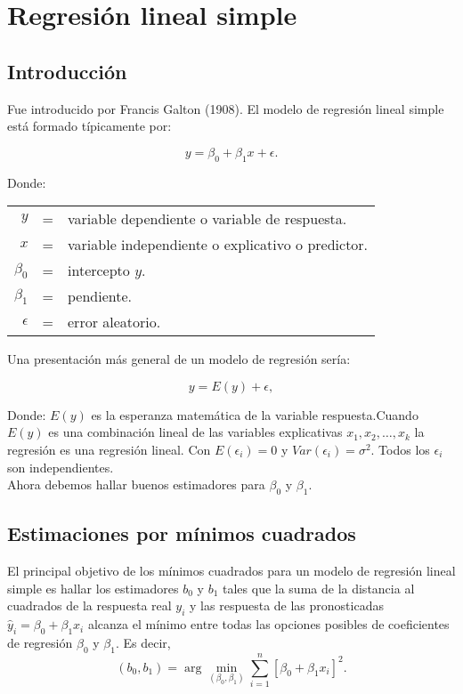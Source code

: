 \chapter{Regresión lineal simple}

\section{Introducción}
Fue introducido por Francis Galton (1908). El modelo de regresión lineal simple está formado típicamente por:

$$y=\beta_0+\beta_1x+\epsilon.$$

Donde:\\

\begin{tabular}{rcl}

    $y$ &=& variable dependiente o variable de respuesta.\\
    $x$ &=& variable independiente o explicativo o predictor.\\ 
    $\beta_0$ &=& intercepto  $y$.\\
    $\beta_1$ &=& pendiente.\\ 
    $\epsilon$ &=& error aleatorio.

\end{tabular}

Una presentación más general de un modelo de regresión sería:

$$y=E(y)+\epsilon,$$

Donde: $E(y)$ es la esperanza matemática de la variable respuesta.Cuando $E(y)$ es una combinación lineal  de las variables explicativas $x_1,x_2,\ldots, x_k$ la regresión es una regresión lineal. Con $E(\epsilon_i)=0$ y $Var(\epsilon_i)=\sigma^2$. Todos los $\epsilon_i$ son independientes.\\

Ahora debemos hallar buenos estimadores para $\beta_0$ y $\beta_1$.


\section{Estimaciones por mínimos cuadrados}
El principal objetivo de los mínimos cuadrados para un modelo de regresión lineal simple es hallar los estimadores $b_0$ y $b_1$ tales que la suma de la distancia al cuadrados de la respuesta real $y_i$ y las respuesta de las pronosticadas $\hat{y}_i=\beta_0+\beta_1x_i$ alcanza el mínimo entre todas las opciones posibles de coeficientes de regresión $\beta_0$ y $\beta_1$. Es decir,
$$(b_0,b_1)=\arg \min_{(\beta_0,\beta_1)}\sum_{i=1}^n \left[\beta_0+\beta_1 x_i\right]^2.$$

